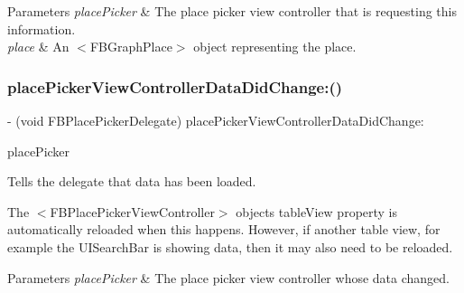 \begin{DoxyParams}{Parameters}
{\em place\+Picker} & The place picker view controller that is requesting this information. \\
\hline
{\em place} & An $<$\+F\+B\+Graph\+Place$>$ object representing the place. \\
\hline
\end{DoxyParams}
\mbox{\label{protocolFBPlacePickerDelegate_01-p_aaa234bae2ec98cf414ef201da6264c67}} 
\subsubsection{\texorpdfstring{place\+Picker\+View\+Controller\+Data\+Did\+Change\+:()}{placePickerViewControllerDataDidChange:()}\hspace{0.1cm}{\footnotesize\ttfamily [1/5]}}
{\footnotesize\ttfamily -\/ (void F\+B\+Place\+Picker\+Delegate) place\+Picker\+View\+Controller\+Data\+Did\+Change\+: \begin{DoxyParamCaption}\item[{(\hyperlink{interfaceFBPlacePickerViewController}{F\+B\+Place\+Picker\+View\+Controller} $\ast$)}]{place\+Picker }\end{DoxyParamCaption}\hspace{0.3cm}{\ttfamily [optional]}}

Tells the delegate that data has been loaded.

The $<$\+F\+B\+Place\+Picker\+View\+Controller$>$ object\textquotesingle{}s {\ttfamily table\+View} property is automatically reloaded when this happens. However, if another table view, for example the {\ttfamily U\+I\+Search\+Bar} is showing data, then it may also need to be reloaded.


\begin{DoxyParams}{Parameters}
{\em place\+Picker} & The place picker view controller whose data changed. \\
\hline
\end{DoxyParams}
\mbox{\label{protocolFBPlacePickerDelegate_01-p_aaa234bae2ec98cf414ef201da6264c67}} 
